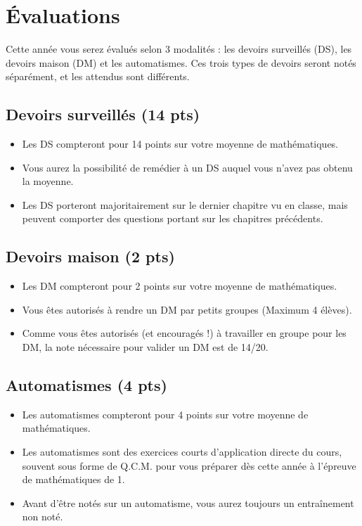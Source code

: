 \documentclass[oneside,12pt]{article}          %
\begin{document}
\section{Évaluations}

Cette année vous serez évalués selon 3 modalités : les devoirs surveillés (DS), les devoirs maison (DM) et les automatismes. Ces trois types de devoirs seront notés séparément, et les attendus sont différents.

\subsection*{Devoirs surveillés (14 pts) }
\begin{itemize}[label=$\bullet$]
	\item Les DS compteront pour 14 points sur votre moyenne de mathématiques.
	\item Vous aurez la possibilité de remédier à un DS auquel vous n'avez pas obtenu la moyenne.
	\item Les DS porteront majoritairement sur le dernier chapitre vu en classe, mais peuvent comporter des questions portant sur les chapitres précédents.
\end{itemize}

\subsection*{Devoirs maison (2 pts) }
\begin{itemize}[label=$\bullet$]
	\item Les DM compteront pour 2 points sur votre moyenne de mathématiques.
	\item Vous êtes autorisés à rendre un DM par petits groupes (Maximum 4 élèves).
	\item Comme vous êtes autorisés (et encouragés !) à travailler en groupe pour les DM, la note nécessaire pour valider un DM est de 14/20.
\end{itemize}

\subsection*{Automatismes (4 pts) }
\begin{itemize}[label=$\bullet$]
	\item Les automatismes compteront pour 4 points sur votre moyenne de mathématiques.
	\item Les automatismes sont des exercices courts d'application directe du cours, souvent sous forme de Q.C.M. pour vous préparer dès cette année à l'épreuve de mathématiques de 1.
	\item Avant d'être notés sur un automatisme, vous aurez toujours un entraînement non noté.
\end{itemize}
\end{document}
